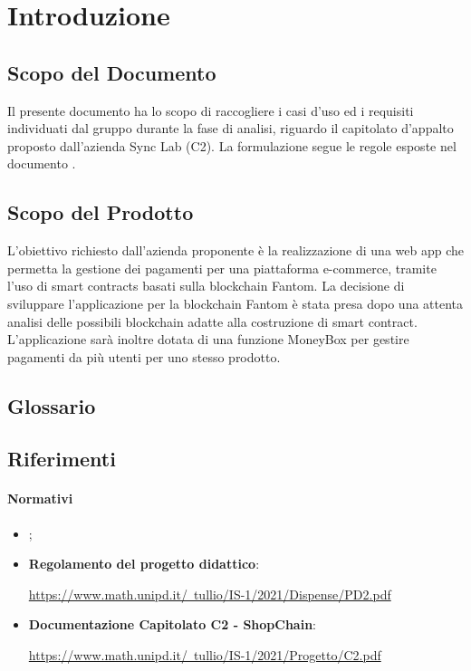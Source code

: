 \section{Introduzione} \label{section:introduzione}

\subsection{Scopo del Documento}
Il presente documento ha lo scopo di raccogliere i casi d'uso ed i requisiti individuati dal gruppo
durante la fase di analisi, riguardo il capitolato d'appalto proposto dall'azienda Sync Lab (C2).
La formulazione segue le regole esposte nel documento \docNameVersionNdP{}.

\subsection{Scopo del Prodotto}
L'obiettivo richiesto dall'azienda proponente è la realizzazione di una web app\glo{} che permetta la gestione dei pagamenti per una piattaforma e-commerce\glo{}, tramite l'uso di smart contracts\glo{} basati sulla blockchain\glo{} Fantom\glo{}.
La decisione di sviluppare l'applicazione per la blockchain\glo{} Fantom\glo{} è stata presa dopo una attenta analisi delle possibili blockchain\glo{} adatte alla costruzione di smart contract\glo{}.
L'applicazione sarà inoltre dotata di una funzione MoneyBox\glo{} per gestire pagamenti da più utenti per uno stesso prodotto.

\subsection{Glossario}
\gloDesc{}

\subsection{Riferimenti}

\paragraph{Normativi}
\begin{itemize}
    \item \textbf{\docNameVersionNdP{}};
    \item \textbf{Regolamento del progetto didattico}:
          \begin{center}
              \href{https://www.math.unipd.it/~tullio/IS-1/2021/Dispense/PD2.pdf}{https://www.math.unipd.it/~tullio/IS-1/2021/Dispense/PD2.pdf}
          \end{center}
    \item \textbf{Documentazione Capitolato C2 - ShopChain}:
          \begin{center}
              \href{https://www.math.unipd.it/~tullio/IS-1/2021/Progetto/C2.pdf}{https://www.math.unipd.it/~tullio/IS-1/2021/Progetto/C2.pdf}
          \end{center}
\end{itemize}

